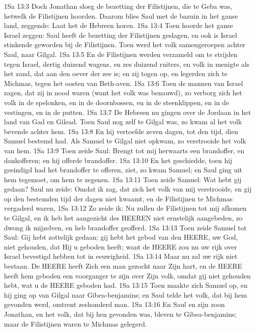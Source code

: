 1Sa 13:3  Doch Jonathan sloeg de bezetting der Filistijnen, die te Geba was, hetwelk de Filistijnen hoorden. Daarom blies Saul met de bazuin in het ganse land, zeggende: Laat het de Hebreen horen.
1Sa 13:4  Toen hoorde het ganse Israel zeggen: Saul heeft de bezetting der Filistijnen geslagen, en ook is Israel stinkende geworden bij de Filistijnen. Toen werd het volk samengeroepen achter Saul, naar Gilgal.
1Sa 13:5  En de Filistijnen werden verzameld om te strijden tegen Israel, dertig duizend wagens, en zes duizend ruiters, en volk in menigte als het zand, dat aan den oever der zee is; en zij togen op, en legerden zich te Michmas, tegen het oosten van Beth-aven.
1Sa 13:6  Toen de mannen van Israel zagen, dat zij in nood waren (want het volk was benauwd), zo verborg zich het volk in de spelonken, en in de doornbossen, en in de steenklippen, en in de vestingen, en in de putten.
1Sa 13:7  De Hebreen nu gingen over de Jordaan in het land van Gad en Gilead. Toen Saul nog zelf te Gilgal was, zo kwam al het volk bevende achter hem.
1Sa 13:8  En hij vertoefde zeven dagen, tot den tijd, dien Samuel bestemd had. Als Samuel te Gilgal niet opkwam, zo verstrooide het volk van hem.
1Sa 13:9  Toen zeide Saul: Brengt tot mij herwaarts een brandoffer, en dankofferen; en hij offerde brandoffer.
1Sa 13:10  En het geschiedde, toen hij geeindigd had het brandoffer te offeren, ziet, zo kwam Samuel; en Saul ging uit hem tegemoet, om hem te zegenen.
1Sa 13:11  Toen zeide Samuel: Wat hebt gij gedaan? Saul nu zeide: Omdat ik zag, dat zich het volk van mij verstrooide, en gij op den bestemden tijd der dagen niet kwaamt, en de Filistijnen te Michmas vergaderd waren,
1Sa 13:12  Zo zeide ik: Nu zullen de Filistijnen tot mij afkomen te Gilgal, en ik heb het aangezicht des HEEREN niet ernstelijk aangebeden, zo dwong ik mijzelven, en heb brandoffer geofferd.
1Sa 13:13  Toen zeide Samuel tot Saul: Gij hebt zottelijk gedaan; gij hebt het gebod van den HEERE, uw God, niet gehouden, dat Hij u geboden heeft; want de HEERE zou nu uw rijk over Israel bevestigd hebben tot in eeuwigheid.
1Sa 13:14  Maar nu zal uw rijk niet bestaan. De HEERE heeft Zich een man gezocht naar Zijn hart, en de HEERE heeft hem geboden een voorganger te zijn over Zijn volk, omdat gij niet gehouden hebt, wat u de HEERE geboden had.
1Sa 13:15  Toen maakte zich Samuel op, en hij ging op van Gilgal naar Gibea-benjamins; en Saul telde het volk, dat bij hem gevonden werd, omtrent zeshonderd man.
1Sa 13:16  En Saul en zijn zoon Jonathan, en het volk, dat bij hen gevonden was, bleven te Gibea-benjamins; maar de Filistijnen waren te Michmas gelegerd.
